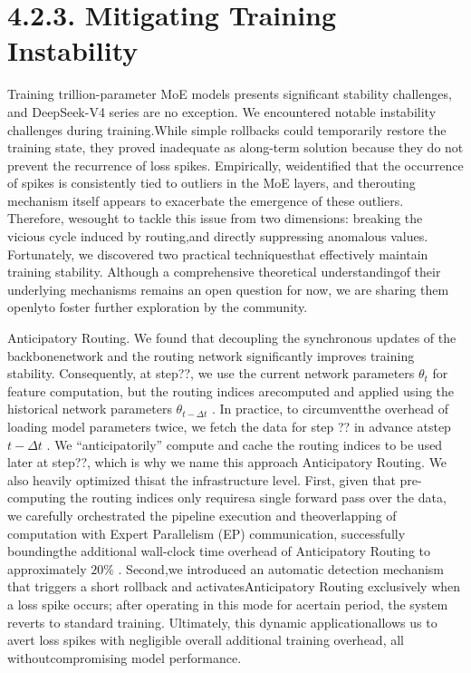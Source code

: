 \documentclass[
  10
]{article}
\begin{document}
\section{4.2.3. Mitigating Training
Instability}\label{mitigating-training-instability}

Training trillion-parameter MoE models presents significant stability
challenges, and DeepSeek-V4 series are no exception. We encountered
notable instability challenges during training.While simple rollbacks
could temporarily restore the training state, they proved inadequate as
along-term solution because they do not prevent the recurrence of loss
spikes. Empirically, weidentified that the occurrence of spikes is
consistently tied to outliers in the MoE layers, and therouting
mechanism itself appears to exacerbate the emergence of these outliers.
Therefore, wesought to tackle this issue from two dimensions: breaking
the vicious cycle induced by routing,and directly suppressing anomalous
values. Fortunately, we discovered two practical techniquesthat
effectively maintain training stability. Although a comprehensive
theoretical understandingof their underlying mechanisms remains an open
question for now, we are sharing them openlyto foster further
exploration by the community.

Anticipatory Routing. We found that decoupling the synchronous updates
of the backbonenetwork and the routing network significantly improves
training stability. Consequently, at step??, we use the current network
parameters \(\theta _ { t }\) for feature computation, but the routing
indices arecomputed and applied using the historical network parameters
\(\theta _ { t - \Delta t }\) . In practice, to circumventthe overhead
of loading model parameters twice, we fetch the data for step ?? in
advance atstep \(t - \Delta t\) . We ``anticipatorily'' compute and
cache the routing indices to be used later at step??, which is why we
name this approach Anticipatory Routing. We also heavily optimized
thisat the infrastructure level. First, given that pre-computing the
routing indices only requiresa single forward pass over the data, we
carefully orchestrated the pipeline execution and theoverlapping of
computation with Expert Parallelism (EP) communication, successfully
boundingthe additional wall-clock time overhead of Anticipatory Routing
to approximately \(2 0 \%\) . Second,we introduced an automatic
detection mechanism that triggers a short rollback and
activatesAnticipatory Routing exclusively when a loss spike occurs;
after operating in this mode for acertain period, the system reverts to
standard training. Ultimately, this dynamic applicationallows us to
avert loss spikes with negligible overall additional training overhead,
all withoutcompromising model performance.
\end{document}
